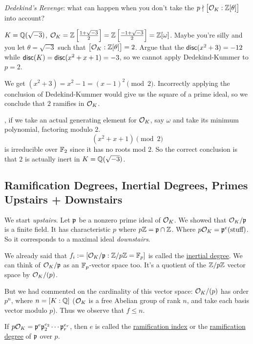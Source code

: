 \begin{example}
    \emph{Dedekind's Revenge}: what can happen when you don't take the $p\nmid \big[\mathcal{O}_K : \mathbb Z[\theta]\big]$ into account?

    $K = \mathbb Q(\sqrt{-3})$, $\mathcal{O}_K = \mathbb Z\left[ \frac{1 + \sqrt{-3}}{2} \right] = \mathbb Z\left[ \frac{-1 + \sqrt{-3}}{2} \right] = \mathbb Z[\omega]$. Maybe you're silly and you let $\theta = \sqrt{-3}$ such that $\big[\mathcal{O}_K : \mathbb Z[\theta]\big] = 2$. Argue that the $\operatorname{\mathsf{disc}}(x^2 + 3) = -12$ while $\operatorname{\mathsf{disc}}(K) = \operatorname{\mathsf{disc}}(x^2 + x + 1) = -3$, so we cannot apply Dedekind-Kummer to $p = 2$.

    We get $(x^2 + 3) = x^2 - 1 = (x-1)^2\pmod{2}$. Incorrectly applying the conclusion of Dedekind-Kummer would give us the square of a prime ideal, so we conclude that $2$ ramifies in $\mathcal{O}_K$.

    \otoh, if we take an actual generating element for $\mathcal{O}_K$, say $\omega$ and take its minimum polynomial, factoring modulo $2$.
    \[(x^2 + x + 1)\pmod{2}\]
    is irreducible over $\mathbb F_2$ since it has no roots mod $2$. So the correct conclusion is that $2$ is actually inert in $K = \mathbb Q(\sqrt{-3})$.
\end{example}

\subsection{Ramification Degrees, Inertial Degrees, Primes Upstairs + Downstairs}
We start \emph{upstairs}. Let $\mathfrak{p}$ be a nonzero prime ideal of $\mathcal{O}_K$. We showed that $\mathcal{O}_K/\mathfrak{p}$ is a finite field. It has characteristic $p$ where $p\mathbb Z = \mathfrak{p}\cap \mathbb Z$. Where $p\mathcal{O}_K = \mathfrak{p}^e(\text{stuff})$. So it corresponds to a maximal ideal \emph{downstairs}.

We already said that $f_i := \left[ \mathcal{O}_K/\mathfrak{p} : \mathbb Z/p\mathbb Z = \mathbb F_p \right]$ is called the \ul{inertial degree}. We can think of $\mathcal{O}_K / \mathfrak{p}$ as an $\mathbb F_p$-vector space too. It's a quotient of the $\mathbb Z/p\mathbb Z$ vector space by $\mathcal{O}_K/(p)$.

But we had commented on the cardinality of this vector space: $\mathcal{O}_K/(p)$ has order $p^n$, where $n = [K : \mathbb Q]$ ($\mathcal{O}_K$ is a free Abelian group of rank $n$, and take each basis vector modulo $p$). Thus we observe that $f\leq n$.

If $p\mathcal{O}_K = \mathfrak{p}^e\mathfrak{p}_2^{e_2}\cdots \mathfrak{p}_r^{e_r}$, then $e$ is called the \ul{ramification index} or the \ul{ramification degree} of $\mathfrak{p}$ over $p$.

